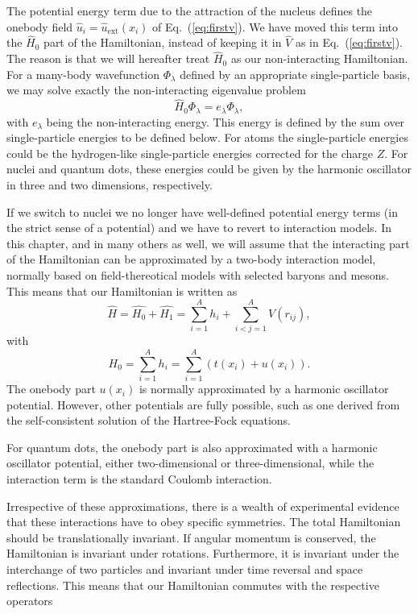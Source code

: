 \begin{itemize}
The potential energy term due to the attraction of the nucleus defines
the onebody field $\hat{u}_i=\hat{u}_{\mathrm{ext}}(x_i)$ of
Eq.~(\ref{eq:firstv}).  We have moved this term into the $\hat{H}_0$
part of the Hamiltonian, instead of keeping it in $\hat{V}$ as in
Eq.~(\ref{eq:firstv}).  The reason is that we will hereafter treat
$\hat{H}_0$ as our non-interacting Hamiltonian. For a many-body
wavefunction $\Phi_{\lambda}$ defined by an appropriate
single-particle basis, we may solve exactly the non-interacting
eigenvalue problem
\[
\hat{H}_0\Phi_{\lambda}= e_{\lambda}\Phi_{\lambda},
\]
with $e_{\lambda}$ being the non-interacting energy. This energy is defined by the sum over single-particle energies to be defined below.
For atoms the single-particle energies could be the hydrogen-like single-particle energies corrected for the charge $Z$. For nuclei and quantum
dots, these energies could be given by the harmonic oscillator in three and two dimensions, respectively.

If we switch to nuclei we no longer have well-defined potential energy  terms (in the strict sense of a potential) and we have to revert
to interaction models.   In this chapter, and in many others as well, we will assume that the interacting part of the Hamiltonian
can be approximated by a two-body interaction model, normally based  on field-thereotical models with selected baryons and mesons.  
This means that our Hamiltonian is written as 
\begin{equation}
    \hat{H} = \hat{H_0} + \hat{H_1} 
    = \sum_{i=1}^A h_i + \sum_{i<j=1}^A V(r_{ij}),
\label{Hnuclei}
\end{equation}
with 
\begin{equation}
  H_0=\sum_{i=1}^A h_i =  \sum_{i=1}^A\left(t(x_i) + u(x_i)\right).
\label{hinuclei}
\end{equation}
The onebody part $u(x_i)$ is normally approximated by a harmonic oscillator potential. However, other potentials are fully possible, such as 
one derived from the self-consistent solution of the Hartree-Fock equations.

For quantum dots, the onebody part is also approximated with a harmonic oscillator potential, either two-dimensional 
or three-dimensional, while the 
interaction term is the standard Coulomb interaction.

Irrespective of these approximations, there is a wealth of experimental evidence that these interactions have to obey specific symmetries. 
The total Hamiltonian should be translationally invariant. If angular momentum is conserved, 
the Hamiltonian is invariant under rotations. Furthermore,
it is invariant under the interchange of two particles and invariant under time reversal and space reflections.  
This means that our Hamiltonian commutes with the respective operators



\end{itemize}
